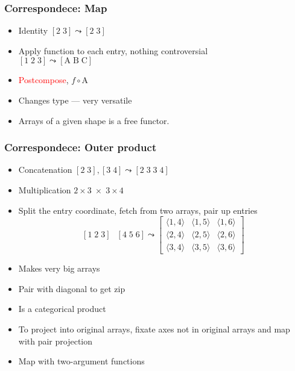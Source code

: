 \documentclass[xetex,mathserif,serif]{beamer}
\newcommand\mrm[1]{\mathrm{#1}}
\newcommand\brm[1]{\bm{\mrm{#1}}}
\newcommand\oprodby[1]{\mathop{\operatorname*{\,\brm{by}}_{#1}\,}}
\newcommand\NB[1]{\textcolor{red}{#1}}
\begin{document}
\begin{frame}
  \frametitle{Correspondece: Map}
  \pause
  \begin{itemize}[<+->]
    \item Identity \([2\;3] \leadsto [2\;3]\)
    \item Apply function to each entry, nothing controversial\\
      \([1\;2\;3] \leadsto [\mrm A\;\mrm B\;\mrm C]\)
    \item \NB{Postcompose}, \(f \circ \brm A\)
    \item Changes type --- very versatile
    \item Arrays of a given shape is a free functor.
  \end{itemize}
\end{frame}

\begin{frame}
  \frametitle{Correspondece: Outer product}
  \pause
  \begin{itemize}[<+->]
    \item Concatenation \([2\;3], [3\;4] \leadsto [2\;3\;3\;4]\)
    \item Multiplication \(2\times3 \;\times\; 3\times4\)
    \item Split the entry coordinate, fetch from two arrays, pair up
      entries
      \[[1\;2\;3] \oprodby{} [4\;5\;6] \leadsto
      \begin{bmatrix}
        \langle1,4\rangle & \langle1,5\rangle & \langle1,6\rangle \\
        \langle2,4\rangle & \langle2,5\rangle & \langle2,6\rangle \\
        \langle3,4\rangle & \langle3,5\rangle & \langle3,6\rangle
      \end{bmatrix}\]
    \item Makes very big arrays
    \item Pair with diagonal to get zip
    \item Is a categorical product
    \item To project into original arrays, fixate axes not in original
      arrays and map with pair projection
    \item Map with two-argument functions
  \end{itemize}
\end{frame}
\end{document}
